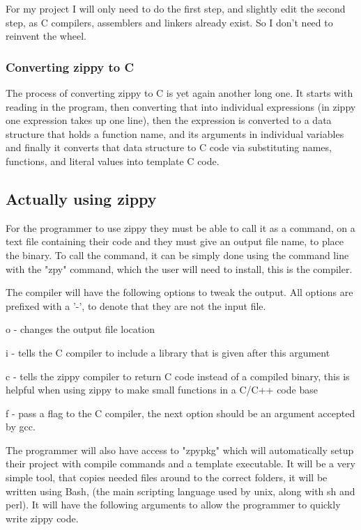 \documentclass[a4paper,12pt]{article}
\begin{document}
{For my project I will only need to do the first step, and slightly edit the second step, as C compilers, assemblers
and linkers already exist. So I don't need to reinvent the wheel.
\subsubsection{Converting zippy to C}
The process of converting zippy to C is yet again another long one. It starts with reading in the program, 
then converting that into individual expressions (in zippy one expression takes up one line), then the expression
is converted to a data structure that holds a function name, and its arguments in individual variables and finally
it converts that data structure to C code via substituting names, functions, and literal values into template C code.
\subsection{Actually using zippy}
For the programmer to use zippy they must be able to call it as a command, on a text file containing their code and
they must give an output file name, to place the binary. To call the command, it can be simply done using the command
line with the "zpy" command, which the user will need to install, this is the compiler.

The compiler will have the following options to tweak the output.
All options are prefixed with a '-', to denote that they are not the input file.

\begin{description}
	\item{o} - changes the output file location
	\item{i} - tells the C compiler to include a library that is given after this argument
	\item{c} - tells the zippy compiler to return C code instead of a compiled binary,
		this is helpful when using zippy to make small functions in a C/C++ code
		base
	\item{f} - pass a flag to the C compiler, the next option should be an argument 
		accepted by gcc.
\end{description}

The programmer will also have access to "zpypkg" which will automatically setup their project with compile commands 
and a template executable. It will be a very simple tool, that copies needed files around to the correct folders,
it will be written using Bash, (the main scripting language used by unix, along with sh and perl). It will have the 
following arguments to allow the programmer to quickly write zippy code.

}
\end{document}
